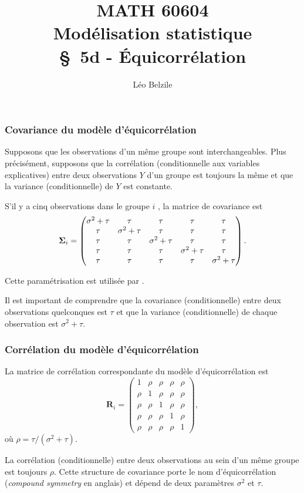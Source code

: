 \documentclass{beamer}
\title[\color{white}{MATH 60604 \S~5d - Équicorrélation}]{\texorpdfstring{MATH 60604 \\Modélisation statistique \\ \S~5d - Équicorrélation}{MATH 60604 \\Modélisation statistique \\ \S~5d - Équicorrélation}}
\author{Léo Belzile}
\institute{HEC Montréal\\
Département de sciences de la décision}
\date{}
\begin{document}
\frame{\titlepage}

\begin{frame}
\frametitle{Covariance du modèle d'équicorrélation}
\bi
\item Supposons que les
observations d'un même groupe sont interchangeables. Plus précisément, 
supposons que la corrélation (conditionnelle aux variables explicatives) entre
deux observations $Y$ d'un groupe est toujours la même et que la variance (conditionnelle) de $Y$ est constante.
\item S'il y a cinq observations dans le groupe $i$ , la matrice de covariance est
{\small \[
\boldsymbol {\Sigma}_i=
  \begin{pmatrix}
    \sigma^2+\tau & \tau & \tau & \tau & \tau\\
    \tau & \sigma^2+\tau & \tau& \tau & \tau\\
    \tau & \tau & \sigma^2+\tau & \tau & \tau\\
    \tau & \tau & \tau & \sigma^2+\tau & \tau\\
    \tau & \tau & \tau & \tau & \sigma^2+\tau
  \end{pmatrix}.
\]
}
\item Cette paramétrisation est utilisée par \SASlang{}. 
\item Il est important de comprendre que la covariance
(conditionnelle) entre deux observations quelconques est $\tau$ et que la
variance (conditionnelle) de chaque observation est $\sigma^2+\tau$.
\ei
\end{frame}

\begin{frame}
\frametitle{Corrélation du modèle d'équicorrélation}
La matrice de corrélation correspondante du modèle d'équicorrélation est
\[
\mathbf{R}_i=
  \begin{pmatrix}
   1 & \rho & \rho & \rho & \rho\\
    \rho &1 & \rho & \rho & \rho\\
   \rho & \rho & 1 &\rho & \rho\\
   \rho & \rho & \rho & 1 &\rho\\
   \rho & \rho & \rho & \rho &1
  \end{pmatrix}, 
\]
où $\rho=\tau/(\sigma^2+\tau)$.
\bi
\item La corrélation (conditionnelle) entre deux observations
au sein d'un même groupe est toujours $\rho$. 
Cette structure
de covariance porte le nom \alert{d'équicorrélation} (\textit{compound symmetry} en anglais) et dépend de deux paramètres $\sigma^2$ et $\tau$.
\ei
\end{frame}
\end{document}

